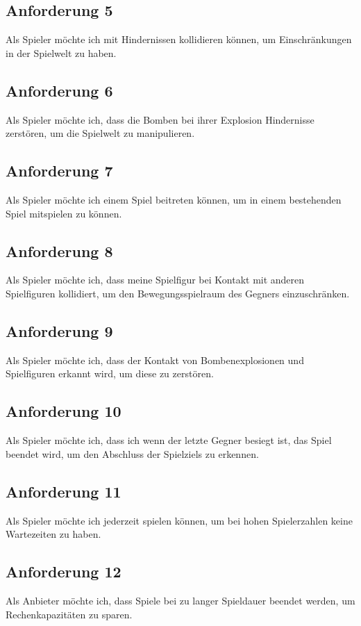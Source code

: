 \documentclass[conference]{IEEEtran}
\begin{document}
\subsection{Anforderung 5} 
Als Spieler möchte ich mit Hindernissen kollidieren können, um Einschränkungen in der Spielwelt zu haben.

\subsection{Anforderung 6}
Als Spieler möchte ich, dass die Bomben bei ihrer Explosion Hindernisse zerstören, um die Spielwelt zu manipulieren.

\subsection{Anforderung 7} 
Als Spieler möchte ich einem Spiel beitreten können, um in einem bestehenden Spiel mitspielen zu können.

\subsection{Anforderung 8}
Als Spieler möchte ich, dass meine Spielfigur bei Kontakt mit anderen Spielfiguren kollidiert, um den Bewegungsspielraum des Gegners einzuschränken.

\subsection{Anforderung 9}
Als Spieler möchte ich, dass der Kontakt von Bombenexplosionen und Spielfiguren erkannt wird, um diese zu zerstören.

\subsection{Anforderung 10}
Als Spieler möchte ich, dass ich wenn der letzte Gegner besiegt ist, das Spiel beendet wird, um den Abschluss der Spielziels zu erkennen.

\subsection{Anforderung 11}
Als Spieler möchte ich jederzeit spielen können, um bei hohen Spielerzahlen keine Wartezeiten zu haben.

\subsection{Anforderung 12} 
Als Anbieter möchte ich, dass Spiele bei zu langer Spieldauer beendet werden, um Rechenkapazitäten zu sparen.
\end{document}
